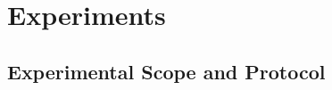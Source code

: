 \documentclass[english, online, cse, master]{dithesis}
\begin{document}
     
\chapter{Experiments}
  \label{experiments}
  \section{Experimental Scope and Protocol}
\end{document}
